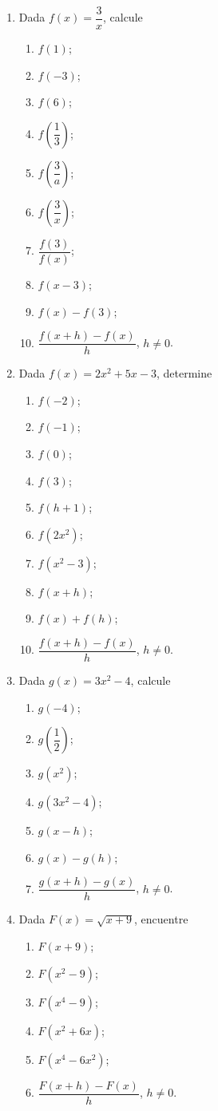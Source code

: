 \documentclass[12pt]{article}
\theoremstyle{remark}
\begin{document}
\begin{enumerate}
\item Dada $f(x)=\dfrac{3}{x}$, calcule
\begin{enumerate}[label=(\alph*)]
\item $f(1)$; \item $f(-3)$; \item $f(6)$; \item $f\!\left(\dfrac13\right)$;
\item $f\!\left(\dfrac3a\right)$; \item $f\!\left(\dfrac3x\right)$;
\item $\dfrac{f(3)}{f(x)}$; \item $f(x-3)$; \item $f(x)-f(3)$;
\item $\dfrac{f(x+h)-f(x)}{h}$, $h\ne0$.
\end{enumerate}

\item Dada $f(x)=2x^2+5x-3$, determine
\begin{enumerate}[label=(\alph*)]
\item $f(-2)$; \item $f(-1)$; \item $f(0)$; \item $f(3)$; \item $f(h+1)$;
\item $f(2x^2)$; \item $f(x^2-3)$; \item $f(x+h)$; \item $f(x)+f(h)$;
\item $\dfrac{f(x+h)-f(x)}{h}$, $h\ne0$.
\end{enumerate}

\item Dada $g(x)=3x^2-4$, calcule
\begin{enumerate}[label=(\alph*)]
\item $g(-4)$; \item $g\!\left(\dfrac12\right)$; \item $g(x^2)$; \item $g(3x^2-4)$;
\item $g(x-h)$; \item $g(x)-g(h)$;
\item $\dfrac{g(x+h)-g(x)}{h}$, $h\ne0$.
\end{enumerate}

\item Dada $F(x)=\sqrt{x+9}$, encuentre
\begin{enumerate}[label=(\alph*)]
\item $F(x+9)$; \item $F(x^2-9)$; \item $F(x^4-9)$; \item $F(x^2+6x)$;
\item $F(x^4-6x^2)$; \item $\dfrac{F(x+h)-F(x)}{h}$, $h\ne0$.
\end{enumerate}


\end{enumerate}
\end{document}
